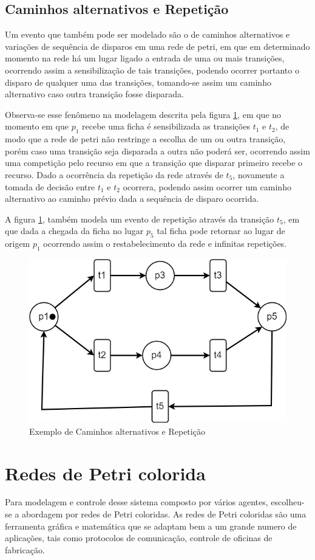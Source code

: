 \subsection{Caminhos alternativos e Repetição}
Um evento que também pode ser modelado são o de caminhos alternativos e variações de sequência de disparos em uma rede de petri, em que em determinado momento na rede há um lugar ligado a entrada de uma ou mais transições, ocorrendo assim a sensibilização de tais transições, podendo ocorrer portanto o disparo de qualquer uma das transições, tomando-se assim um caminho alternativo caso outra transição fosse disparada.

Observa-se esse fenômeno na modelagem descrita pela figura \ref{fig:caminhos_alternativos}, em que no momento em que $p_1$ recebe uma ficha é sensibilizada as transições $t_1$ e $t_2$, de modo que a rede de petri não restringe a escolha de um ou outra transição, porém caso uma transição seja disparada a outra não poderá ser, ocorrendo assim uma competição pelo recurso em que a transição que disparar primeiro recebe o recurso. Dado a ocorrência da repetição da rede através de $t_5$, novamente a tomada de decisão entre $t_1$ e $t_2$ ocorrera, podendo assim ocorrer um caminho alternativo ao caminho prévio dada a sequência de disparo ocorrida.

A figura \ref{fig:caminhos_alternativos}, também modela um evento de repetição através da transição $t_5$, em que dada a chegada da ficha no lugar $p_5$ tal ficha pode retornar ao lugar de origem $p_1$ ocorrendo assim o restabelecimento da rede e infinitas repetições.

\begin{figure}[ht]
    \centering
    \includegraphics[scale=0.4]{figures/Petri/caminhos_alternativos.png}
    \caption{Exemplo de Caminhos alternativos e Repetição}
    \label{fig:caminhos_alternativos}
\end{figure}

\section{Redes de Petri colorida}
Para modelagem e controle desse sistema composto por vários agentes, escolheu-se a abordagem por redes de Petri coloridas. As redes de Petri  coloridas são uma ferramenta gráfica e matemática que se adaptam bem a um grande numero de aplicações, tais como protocolos de comunicação, controle de oficinas de fabricação. 
